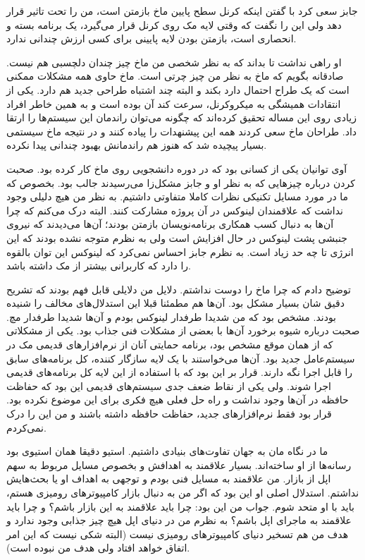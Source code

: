 جابز سعی کرد با گفتن اینکه کرنل سطح پایین ماخ بازمتن است، من را تحت
تاثیر قرار دهد ولی این را نگفت که وقتی لایه مک روی کرنل قرار می‌گیرد،
یک برنامه بسته و انحصاری است، بازمتن بودن لایه پایینی برای کسی ارزش
چندانی ندارد.

او راهی نداشت تا بداند که به نظر شخصی من ماخ چیز چندان دلچسبی هم
نیست. صادقانه بگویم که ماخ به نظر من چیز چرتی است. ماخ حاوی همه مشکلات
ممکنی است که یک طراح احتمال دارد بکند و البته چند اشتباه طراحی جدید هم
دارد. یکی از انتقادات همیشگی به میکروکرنل، سرعت کند آن بوده است و به
همین خاطر افراد زیادی روی این مساله تحقیق کرده‌اند که چگونه می‌توان
راندمان این سیستم‌ها را ارتقا داد. طراحان ماخ سعی کردند همه این
پیشنهدات را پیاده کنند و در نتیجه ماخ سیستمی بسیار پیچیده شد که هنوز
هم راندمانش بهبود چندانی پیدا نکرده.

آوی توانیان یکی از کسانی بود که در دوره دانشجویی روی ماخ کار کرده
بود. صحبت کردن درباره چیزهایی که به نظر او و جابز مشکل‌زا می‌رسیدند جالب
بود. بخصوص که ما در مورد مسایل تکنیکی نظرات کاملا متفاوتی داشتیم. به
نظر من هیچ دلیلی وجود نداشت که علاقمندان لینوکس در آن پروژه مشارکت
کنند. البته درک می‌کنم که چرا آن‌ها به دنبال کسب همکاری برنامه‌نویسان
بازمتن بودند؛ آن‌ها می‌دیدند که نیروی جنبشی پشت لینوکس در حال افزایش است
ولی به نظرم متوجه نشده بودند که این انرژی تا چه حد زیاد است. به نظرم
جابز احساس نمی‌کرد که لینوکس این توان بالقوه را دارد که کاربرانی بیشتر
از مک داشته باشد.

توضیح دادم که چرا ماخ را دوست نداشتم. دلایل من دلایلی قابل فهم بودند
که تشریح دقیق شان بسیار مشکل بود. آن‌ها هم مطمئنا قبلا این استدلال‌های
مخالف را شنیده بودند. مشخص بود که من شدیدا طرفدار لینوکس بودم و آن‌ها
شدیدا طرفدار مچ. صحبت درباره شیوه برخورد آن‌ها با بعضی از مشکلات فنی
جذاب بود. یکی از مشکلاتی که از همان موقع مشخص بود، برنامه حمایتی آنان
از نرم‌افزارهای قدیمی مک در سیستم‌عامل جدید بود. آن‌ها می‌خواستند با یک
لایه سازگار کننده، کل برنامه‌های سابق را قابل اجرا نگه دارند. قرار بر
این بود که با استفاده از این لایه کل برنامه‌های قدیمی اجرا شوند. ولی
یکی از نقاط ضعف جدی سیستم‌های قدیمی این بود که حفاظت حافظه در آن‌‌ها وجود
نداشت و راه حل فعلی هیچ فکری برای این موضوع نکرده بود. قرار بود فقط
نرم‌افزارهای جدید، حفاظت حافظه داشته باشند و من این را درک نمی‌کردم.

ما در نگاه مان به جهان تفاوت‌های بنیادی داشتیم. استیو دقیقا همان استیوی
بود رسانه‌ها از او ساخته‌اند. بسیار علاقمند به اهدافش و بخصوص مسایل
مربوط به سهم اپل از بازار. من علاقمند به مسایل فنی بودم و توجهی به
اهداف او یا بحث‌هایش نداشتم. استدلال اصلی او این بود که اگر من به دنبال
بازار کامپیوترهای رومیزی هستم، باید با او متحد شوم. جواب من این بود:
چرا باید علاقمند به این بازار باشم؟ و چرا باید علاقمند به ماجرای اپل
باشم؟ به نظرم من در دنیای اپل هیچ چیز جذابی وجود ندارد و هدف من هم
تسخیر دنیای کامپیوترهای رومیزی نیست (البته شکی نیست که این امر اتفاق
خواهد افتاد ولی هدف من نبوده است).

